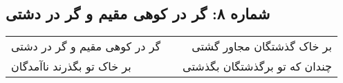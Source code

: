 \begin{center}
\section*{شماره ۸: گر در کوهی مقیم و گر در دشتی}
\label{sec:008}
\begin{longtable}{l p{0.5cm} r}
گر در کوهی مقیم و گر در دشتی
&&
بر خاک گذشتگان مجاور گشتی
\\
بر خاک تو بگذرند ناآمدگان
&&
چندان که تو برگذشتگان بگذشتی
\\
\end{longtable}
\end{center}
